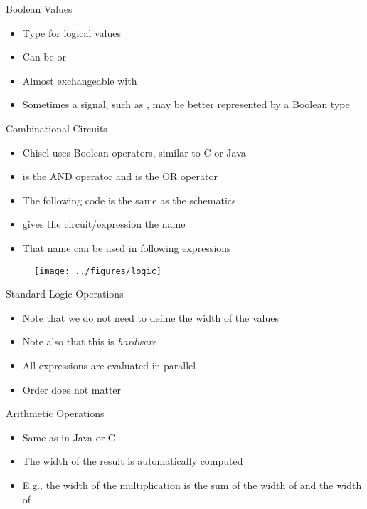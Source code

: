 \begin{frame}[fragile]{Boolean Values}
\begin{itemize}
\item Type for logical values
\item Can be  or 
\item Almost exchangeable with 
\item Sometimes a signal, such as , may be better represented by a Boolean type
\end{itemize}
\end{frame}

\begin{frame}[fragile]{Combinational Circuits}
\begin{itemize}
\item Chisel uses Boolean operators, similar to C or Java
\item \code{\&} is the AND operator and \code{|} is the OR operator
\item The following code is the same as the schematics
\item {} gives the circuit/expression the name 
\item That name can be used in following expressions
\end{itemize}
\begin{figure}
  \texttt{[image: ../figures/logic]}
\end{figure}
\end{frame}

\begin{frame}[fragile]{Standard Logic Operations}
\begin{itemize}
\item Note that we do not need to define the width of the values
\item Note also that this is \emph{hardware}
\item All expressions are evaluated in parallel
\item Order does not matter
\end{itemize}
\end{frame}

\begin{frame}[fragile]{Arithmetic Operations}
\begin{itemize}
\item Same as in Java or C
\item The width of the result is automatically computed
\item E.g., the width of the multiplication is the sum of the width of  and the width of  
\end{itemize}
\end{frame}

